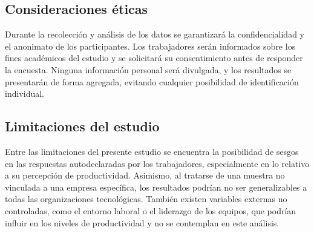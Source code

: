 	\subsection{Consideraciones éticas}
	
	Durante la recolección y análisis de los datos se garantizará la confidencialidad y el anonimato de los participantes. Los trabajadores serán informados sobre los fines académicos del estudio y se solicitará su consentimiento antes de responder la encuesta. Ninguna información personal será divulgada, y los resultados se presentarán de forma agregada, evitando cualquier posibilidad de identificación individual.
	
	\subsection{Limitaciones del estudio}
	
	Entre las limitaciones del presente estudio se encuentra la posibilidad de sesgos en las respuestas autodeclaradas por los trabajadores, especialmente en lo relativo a su percepción de productividad. Asimismo, al tratarse de una muestra no vinculada a una empresa específica, los resultados podrían no ser generalizables a todas las organizaciones tecnológicas. También existen variables externas no controladas, como el entorno laboral o el liderazgo de los equipos, que podrían influir en los niveles de productividad y no se contemplan en este análisis.
